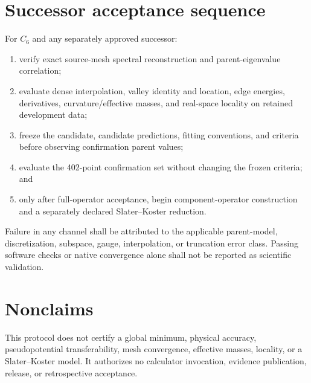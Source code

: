 \documentclass[11pt]{article}
\begin{document}
\section{Successor acceptance sequence}

For $C_6$ and any separately approved successor:

\begin{enumerate}
  \item verify exact source-mesh spectral reconstruction and parent-eigenvalue
    correlation;
  \item evaluate dense interpolation, valley identity and location, edge energies,
    derivatives, curvature/effective masses, and real-space locality on retained
    development data;
  \item freeze the candidate, candidate predictions, fitting conventions, and criteria
    before observing confirmation parent values;
  \item evaluate the 402-point confirmation set without changing the frozen criteria;
    and
  \item only after full-operator acceptance, begin component-operator construction and
    a separately declared Slater--Koster reduction.
\end{enumerate}

Failure in any channel shall be attributed to the applicable parent-model,
discretization, subspace, gauge, interpolation, or truncation error class.  Passing
software checks or native convergence alone shall not be reported as scientific
validation.

\section{Nonclaims}

This protocol does not certify a global minimum, physical accuracy, pseudopotential
transferability, mesh convergence, effective masses, locality, or a Slater--Koster
model.  It authorizes no calculator invocation, evidence publication, release, or
retrospective acceptance.
\end{document}
